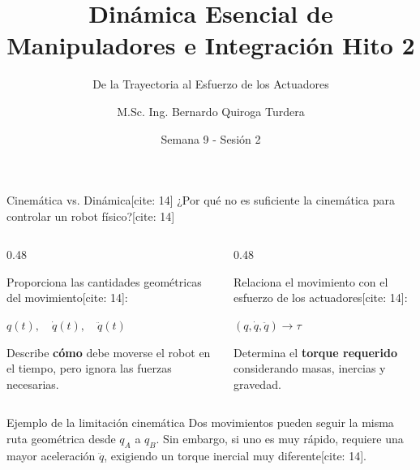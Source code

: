 \documentclass[aspectratio=169, xcolor={table,xcdraw}]{beamer}
\title[Dinámica Esencial]{Dinámica Esencial de Manipuladores e Integración Hito 2}
\subtitle{De la Trayectoria al Esfuerzo de los Actuadores}
\author[B. Quiroga Turdera]{M.Sc. Ing. Bernardo Quiroga Turdera}
\institute[UCB Tarija]{Universidad Católica Boliviana ``San Pablo'' — Sede Tarija}
\date{Semana 9 - Sesión 2}
\begin{document}
\begin{frame}
    \titlepage
\end{frame}

\begin{frame}{Cinemática vs. Dinámica[cite: 14]}
    ¿Por qué no es suficiente la cinemática para controlar un robot físico?[cite: 14]

    \begin{columns}[T]
        \begin{column}{0.48\textwidth}
            \begin{tcolorbox}[colback=ucbblue!5, colframe=ucbblue, title=Cinemática (LSPB), left=1mm, right=1mm, top=1mm, bottom=1mm]
                \small
                Proporciona las cantidades geométricas del movimiento[cite: 14]:
                \begin{center}
                    $q(t), \quad \dot{q}(t), \quad \ddot{q}(t)$
                \end{center}
                Describe \textbf{cómo} debe moverse el robot en el tiempo, pero ignora las fuerzas necesarias.
            \end{tcolorbox}
        \end{column}
        \begin{column}{0.48\textwidth}
            \begin{tcolorbox}[colback=red!5, colframe=red!70!black, title=Dinámica, left=1mm, right=1mm, top=1mm, bottom=1mm]
                \small
                Relaciona el movimiento con el esfuerzo de los actuadores[cite: 14]:
                \begin{center}
                    $\boxed{(q, \dot{q}, \ddot{q}) \longrightarrow \tau}$
                \end{center}
                Determina el \textbf{torque requerido} considerando masas, inercias y gravedad.
            \end{tcolorbox}
        \end{column}
    \end{columns}
    
    \vfill
    \begin{alertblock}{Ejemplo de la limitación cinemática}
        \small Dos movimientos pueden seguir la misma ruta geométrica desde $q_A$ a $q_B$. Sin embargo, si uno es muy rápido, requiere una mayor aceleración $\ddot{q}$, exigiendo un torque inercial muy diferente[cite: 14].
    \end{alertblock}
\end{frame}
\end{document}

